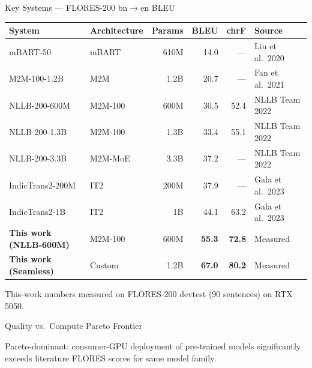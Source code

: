 \documentclass[aspectratio=169,10pt]{beamer}
\begin{document}
\begin{frame}{Key Systems --- FLORES-200 bn$\to$en BLEU}
  \small
  \begin{table}
  \begin{tabular}{llrrrl}
    \toprule
    System & Architecture & Params & BLEU & chrF & Source \\
    \midrule
    mBART-50         & mBART    & 610M  & 14.0 & ---  & Liu et al.\ 2020 \\
    M2M-100-1.2B     & M2M      & 1.2B  & 20.7 & ---  & Fan et al.\ 2021 \\
    NLLB-200-600M    & M2M-100  & 600M  & 30.5 & 52.4 & NLLB Team 2022 \\
    NLLB-200-1.3B    & M2M-100  & 1.3B  & 33.4 & 55.1 & NLLB Team 2022 \\
    NLLB-200-3.3B    & M2M-MoE  & 3.3B  & 37.2 & ---  & NLLB Team 2022 \\
    IndicTrans2-200M & IT2      & 200M  & 37.9 & ---  & Gala et al.\ 2023 \\
    IndicTrans2-1B   & IT2      & 1B    & 44.1 & 63.2 & Gala et al.\ 2023 \\
    \midrule
    \textbf{This work (NLLB-600M)} & M2M-100 & 600M & \textbf{55.3} & \textbf{72.8} & Measured \\
    \textbf{This work (Seamless)}  & Custom  & 1.2B & \textbf{67.0} & \textbf{80.2} & Measured \\
    \bottomrule
  \end{tabular}
  \end{table}
  \vspace{0.1cm}
  \footnotesize This-work numbers measured on FLORES-200 devtest (90 sentences) on RTX 5050.
\end{frame}

\begin{frame}{Quality vs.\ Compute Pareto Frontier}
  \begin{center}
  \end{center}
  \small Pareto-dominant: consumer-GPU deployment of pre-trained models significantly
  exceeds literature FLORES scores for same model family.
\end{frame}
\end{document}
